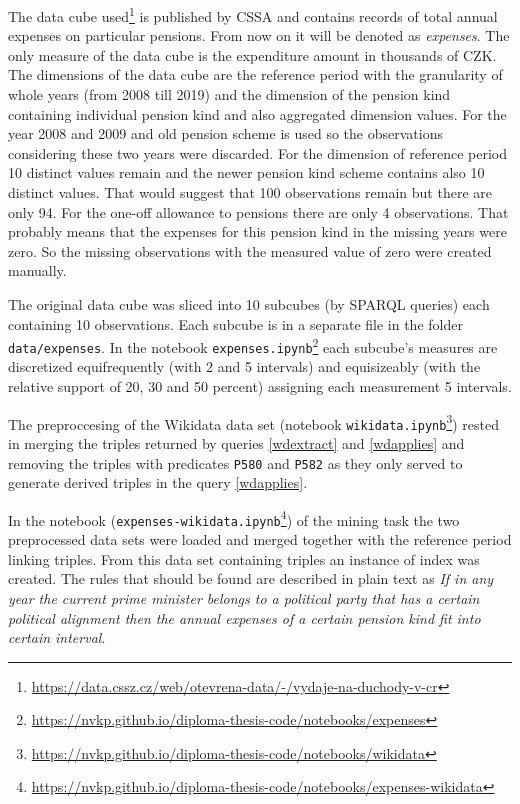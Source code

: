 The data cube used\footnote{\href{https://data.cssz.cz/web/otevrena-data/-/vydaje-na-duchody-v-cr}{https://data.cssz.cz/web/otevrena-data/-/vydaje-na-duchody-v-cr}} is published by CSSA and contains records of total annual expenses on particular pensions. From now on it will be denoted as \textit{expenses}. The only measure of the data cube is the expenditure amount in thousands of CZK. The dimensions of the data cube are the reference period with the granularity of whole years (from 2008 till 2019) and the dimension of the pension kind containing individual pension kind and also aggregated dimension values. For the year 2008 and 2009 and old pension scheme is used so the observations considering these two years were discarded. For the dimension of reference period 10 distinct values remain and the newer pension kind scheme contains also 10 distinct values. That would suggest that 100 observations remain but there are only 94. For the one-off allowance to pensions there are only 4 observations. That probably means that the expenses for this pension kind in the missing years were zero. So the missing observations with the measured value of zero were created manually.

The original data cube was sliced into 10 subcubes (by SPARQL queries) each containing 10 observations. Each subcube is in a separate file in the folder \verb|data/expenses|. In the notebook \verb|expenses.ipynb|\footnote{\href{https://nvkp.github.io/diploma-thesis-code/notebooks/expenses}{https://nvkp.github.io/diploma-thesis-code/notebooks/expenses}} each subcube's measures are discretized equifrequently (with 2 and 5 intervals) and equisizeably (with the relative support of 20, 30 and 50 percent) assigning each measurement 5 intervals.

The preproccesing of the Wikidata data set (notebook \verb|wikidata.ipynb|\footnote{\href{https://nvkp.github.io/diploma-thesis-code/notebooks/wikidata}{https://nvkp.github.io/diploma-thesis-code/notebooks/wikidata}}) rested in merging the triples returned by queries \ref{wdextract} and \ref{wdapplies} and removing the triples with predicates \verb|P580| and \verb|P582| as they only served to generate derived triples in the query \ref{wdapplies}.

In the notebook (\verb|expenses-wikidata.ipynb|\footnote{\href{https://nvkp.github.io/diploma-thesis-code/notebooks/expenses-wikidata}{https://nvkp.github.io/diploma-thesis-code/notebooks/expenses-wikidata}}) of the mining task the two preprocessed data sets were loaded and merged together with the reference period linking triples. From this data set containing  triples an instance of index was created. The rules that should be found are described in plain text as \textit{If in any year the current prime minister belongs to a political party that has a certain political alignment then the annual expenses of a certain pension kind fit into certain interval}. 


